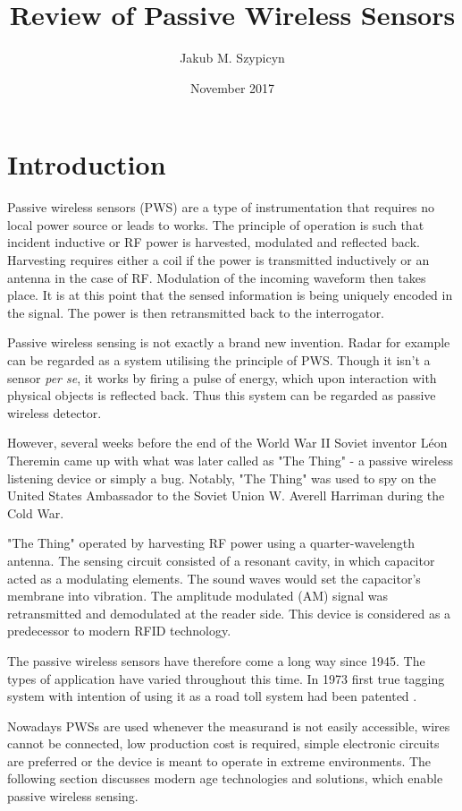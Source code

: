 \documentclass[11pt,a4paper]{article}
\begin{document}
\title{Review of Passive Wireless Sensors}
\author{Jakub M. Szypicyn}
\date{November 2017}
\maketitle
\tableofcontents
\pagebreak
\section{Introduction}

Passive wireless sensors (PWS) are a type of instrumentation that requires no local power source or leads to works. The principle of operation is such that incident inductive or RF power is harvested, modulated and reflected back. Harvesting requires either a coil if the power is transmitted inductively or an antenna in the case of RF. Modulation of the incoming waveform then takes place. It is at this point that the sensed information is being uniquely encoded in the signal. The power is then retransmitted back to the interrogator.

Passive wireless sensing is not exactly a brand new invention. Radar for example can be regarded as a system utilising the principle of PWS. Though it isn't a sensor \textit{per se}, it works by firing a pulse of energy, which upon interaction with physical objects is reflected back. Thus this system can be regarded as passive wireless detector.

However, several weeks before the end of the World War II Soviet inventor Léon Theremin came up with what was later called as "The Thing" - a passive wireless listening device or simply a bug. Notably, "The Thing" was used to spy on the United States Ambassador to the Soviet Union W. Averell Harriman during the Cold War. 

"The Thing" operated by harvesting RF power using a quarter-wavelength antenna. The sensing circuit consisted of a resonant cavity, in which capacitor acted as a modulating elements. The sound waves would set the capacitor's membrane into vibration. The amplitude modulated (AM) signal was retransmitted and demodulated at the reader side. This device is considered as a predecessor to modern RFID technology\cite{thing}.

The passive wireless sensors have therefore come a long way since 1945. The types of application have varied throughout this time. In 1973 first true tagging system with intention of using it as a road toll system had been patented \cite{toll}.

Nowadays PWSs are used whenever the measurand is not easily accessible, wires cannot be connected, low production cost is required, simple electronic circuits are preferred or the device is meant to operate in extreme environments. The following section discusses modern age technologies and solutions, which enable passive wireless sensing.
\end{document}
